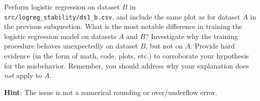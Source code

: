 \item {}
Perform logistic regression on dataset $B$ in \\
\texttt{src/logreg\_stability/ds1\_b.csv}, and include the same plot as for dataset $A$ in the previous subquestion.
What is the most notable difference in training the logistic regression model
on datasets $A$ and $B$? Investigate why the training procedure behaves unexpectedly on dataset $B$, but
not on $A$. Provide hard evidence (in the form of math, code, plots, etc.) to
corroborate your hypothesis for the misbehavior. Remember, you should address
why your explanation does \emph{not} apply to $A$.

\textbf{Hint}: The issue is not a numerical rounding or over/underflow error.
